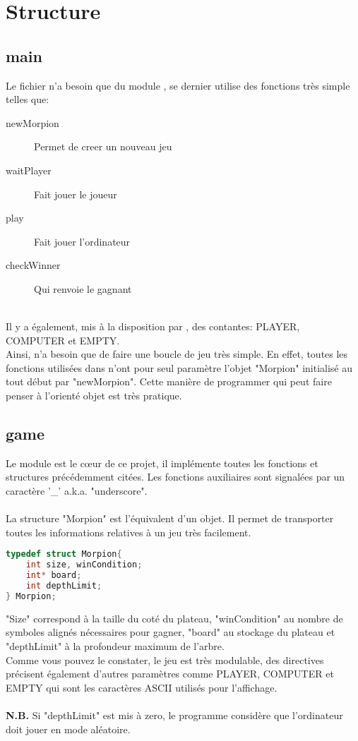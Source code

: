 \documentclass[a4paper, 11pt]{article}
\begin{document}
\section{Structure}

\subsection{main}

Le fichier  n'a besoin que du module , se dernier utilise des fonctions très simple telles que: \\
\begin{description}
	\item[newMorpion] Permet de creer un nouveau jeu
	\item[waitPlayer] Fait jouer le joueur
	\item[play] Fait jouer l'ordinateur
	\item[checkWinner] Qui renvoie le gagnant
\end{description}
\ \\
Il y a également, mis à la disposition par , des contantes: PLAYER, COMPUTER et EMPTY. \\
Ainsi,  n'a besoin que de faire une boucle de jeu très simple. En effet, toutes les fonctions utilisées dans  n'ont pour seul paramètre l'objet "Morpion" initialisé au tout début par "newMorpion". Cette manière de programmer qui peut faire penser à l'orienté objet est très pratique.

\subsection{game}

Le module  est le cœur de ce projet, il implémente toutes les fonctions et structures précédemment citées. Les fonctions auxiliaires sont signalées par un caractère '\_' a.k.a. "underscore".\\
\\
La structure "Morpion" est l'équivalent d'un objet. Il permet de transporter toutes les informations relatives à un jeu très facilement.\\
\begin{lstlisting}[language=C]
typedef struct Morpion{
    int size, winCondition;
    int* board;
    int depthLimit;
} Morpion;
\end{lstlisting}

"Size" correspond à la taille du coté du plateau, "winCondition" au nombre de symboles alignés nécessaires pour gagner, "board" au stockage du plateau et "depthLimit" à la profondeur maximum de l'arbre. \\
Comme vous pouvez le constater, le jeu est très modulable, des directives précisent également d'autres paramètres comme PLAYER, COMPUTER et EMPTY qui sont les caractères ASCII utilisés pour l'affichage.\\
\\
\textbf{N.B.} Si "depthLimit" est mis à zero, le programme considère que l'ordinateur doit jouer en mode aléatoire. \\
\end{document}
